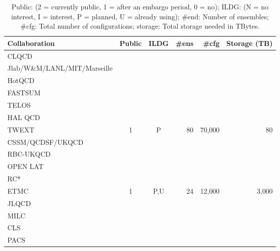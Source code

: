\documentclass[a4paper,11pt]{article}
\begin{document}
\begin{table}[h]
  \caption{ Public: (2 = currently public, 1 = after an embargo period, 0 = no); ILDG: (N = no interest, I =
    interest, P = planned, U = already using); \#end: Number of
    ensembles; \#cfg: Total number of configurations; storage: Total
    storage needed in TBytes.
    \label{tab:summary}
  }
  \centering
  \begin{tabular}{lccrrr}\hline\hline
    Collaboration                & Public & ILDG & \#ens & \#cfg & Storage (TB) \\\hline
    CLQCD                        &        &      &       &       &              \\
    Jlab/W\&M/LANL/MIT/Marseille &        &      &       &       &              \\
    HotQCD                       &        &      &       &       &              \\
    FASTSUM                      &        &      &       &       &              \\
    TELOS                        &        &      &       &       &              \\
    HAL QCD                      &        &      &       &       &              \\
    TWEXT                        &    1   &  P   &  80   &70,000 &  80          \\
    CSSM/QCDSF/UKQCD             &        &      &       &       &              \\
    RBC-UKQCD                    &        &      &       &       &              \\
    OPEN LAT                     &        &      &       &       &              \\
    RC*                          &        &      &       &       &              \\
    ETMC                         &    1   &  P,U &  24   &12,000 & 3,000        \\
    JLQCD                        &        &      &       &       &              \\
    MILC                         &        &      &       &       &              \\
    CLS                          &        &      &       &       &              \\
    PACS                         &        &      &       &       &              \\\hline\hline
  \end{tabular}
\end{table}
\end{document}
